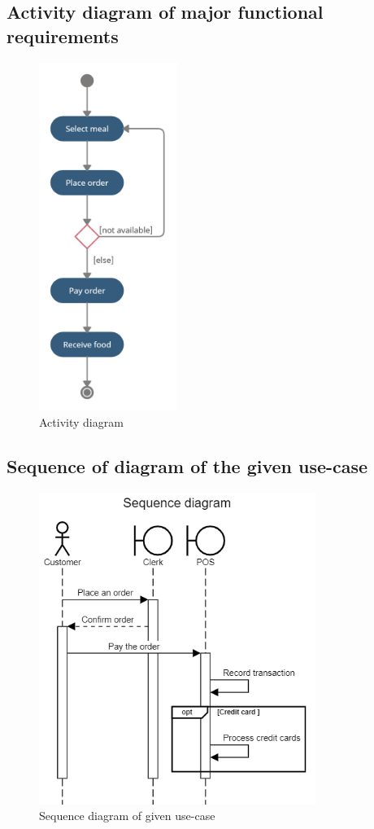 \documentclass[a4paper]{article}
\numberwithin{equation}{section}
\begin{document}
\subsection{Activity diagram of major functional requirements}
\begin{figure}[H]
  \centering
  \includegraphics[width=0.4\textwidth]{./assets/t2/Activity_Diagram.png}
  \caption{Activity diagram}
\end{figure}

\subsection{Sequence of diagram of the given use-case}
\begin{figure}[H]
  \centering
  \includegraphics[width=0.8\textwidth]{./assets/t2/sqd_2.3.png}
  \caption{Sequence diagram of given use-case}
\end{figure}
\end{document}
